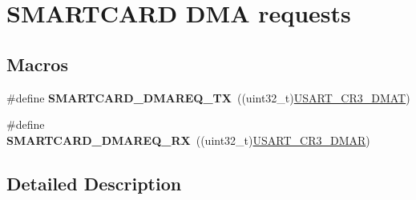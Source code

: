 \hypertarget{group___smart_card___d_m_a___requests}{}\section{S\+M\+A\+R\+T\+C\+A\+RD D\+MA requests}
\label{group___smart_card___d_m_a___requests}
\subsection*{Macros}
\begin{DoxyCompactItemize}
\item 
\#define {\bfseries S\+M\+A\+R\+T\+C\+A\+R\+D\+\_\+\+D\+M\+A\+R\+E\+Q\+\_\+\+TX}~((uint32\+\_\+t)\hyperlink{group___peripheral___registers___bits___definition_ga5bb515d3814d448f84e2c98bf44f3993}{U\+S\+A\+R\+T\+\_\+\+C\+R3\+\_\+\+D\+M\+AT})\hypertarget{group___smart_card___d_m_a___requests_gafc7f43a4fd2402ac26d5ca9f7e398471}{}\label{group___smart_card___d_m_a___requests_gafc7f43a4fd2402ac26d5ca9f7e398471}

\item 
\#define {\bfseries S\+M\+A\+R\+T\+C\+A\+R\+D\+\_\+\+D\+M\+A\+R\+E\+Q\+\_\+\+RX}~((uint32\+\_\+t)\hyperlink{group___peripheral___registers___bits___definition_gaff130f15493c765353ec2fd605667c5a}{U\+S\+A\+R\+T\+\_\+\+C\+R3\+\_\+\+D\+M\+AR})\hypertarget{group___smart_card___d_m_a___requests_ga6b694a965ea96e1e33646a538ea10d87}{}\label{group___smart_card___d_m_a___requests_ga6b694a965ea96e1e33646a538ea10d87}

\end{DoxyCompactItemize}


\subsection{Detailed Description}
